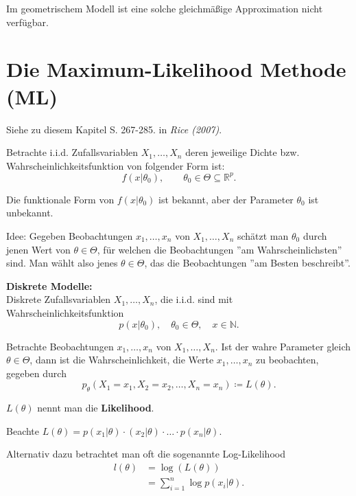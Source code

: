 \documentclass{tstextbook}
\newcommand{\N}{\mathbb N}
\newcommand{\R}{\mathbb R}
\begin{document}
Im geometrischem Modell ist eine solche gleichmäßige Approximation nicht verfügbar.


\section{Die Maximum-Likelihood Methode (ML)}

\begin{book}
	Siehe zu diesem Kapitel S. 267-285. in	\textit{Rice (2007)}.
\end{book}


Betrachte i.i.d. Zufallsvariablen $ X_1,\ldots,X_n $ deren jeweilige Dichte bzw. Wahrscheinlichkeitsfunktion von folgender Form ist: 
\[
f(x|\theta_0), \qquad \theta_0 \in \Theta \subseteq \R^p.
\]

Die funktionale Form von $ f(x|\theta_0) $ ist bekannt, aber der Parameter $ \theta_0 $ ist unbekannt. 

\begin{remark}
	Idee: Gegeben Beobachtungen $ x_1,\ldots,x_n $ von $ X_1,\ldots,X_n $ schätzt man $ \theta_0 $ durch jenen Wert von $ \theta\in\Theta $, für welchen die Beobachtungen ''am Wahrscheinlichsten'' sind. Man wählt also jenes $ \theta\in\Theta $, das die Beobachtungen ''am Besten beschreibt''. 
\end{remark}

	
\textbf{Diskrete Modelle:} \\

Diskrete Zufallsvariablen $ X_1,\ldots,X_n $, die i.i.d. sind mit Wahrscheinlichkeitsfunktion 
\[
p(x|\theta_0), \quad \theta_0\in\Theta, \quad x\in\N.
\]

Betrachte Beobachtungen $ x_1,\ldots,x_n $ von $ X_1,\ldots,X_n $. Ist der wahre Parameter gleich $ \theta\in\Theta $, dann ist die Wahrscheinlichkeit, die Werte $ x_1,\ldots,x_n $ zu beobachten, gegeben durch 
\[
p_\theta \left(X_1=x_1,X_2=x_2,\ldots,X_n=x_n\right) \coloneqq L(\theta).
\]

$ L(\theta) $ nennt man die \textbf{Likelihood}. 

Beachte $ L(\theta) = p(x_1|\theta)\cdotp(x_2|\theta)\cdot\ldots\cdot p(x_n|\theta) $.

Alternativ dazu betrachtet man oft die sogenannte Log-Likelihood
\[\begin{aligned}
	l(\theta) & = \log(L(\theta)) \\
	& = \sum_{i=1}^{n}\log p(x_i|\theta).
\end{aligned}
\]
\end{document}
